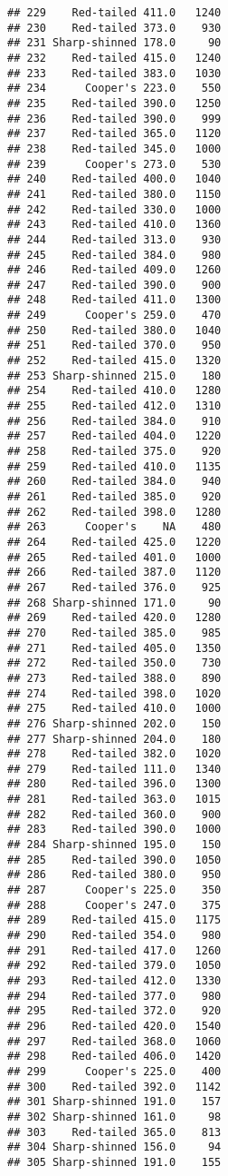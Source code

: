\documentclass[
]{article}
\begin{document}
\begin{verbatim}
## 229    Red-tailed 411.0   1240
## 230    Red-tailed 373.0    930
## 231 Sharp-shinned 178.0     90
## 232    Red-tailed 415.0   1240
## 233    Red-tailed 383.0   1030
## 234      Cooper's 223.0    550
## 235    Red-tailed 390.0   1250
## 236    Red-tailed 390.0    999
## 237    Red-tailed 365.0   1120
## 238    Red-tailed 345.0   1000
## 239      Cooper's 273.0    530
## 240    Red-tailed 400.0   1040
## 241    Red-tailed 380.0   1150
## 242    Red-tailed 330.0   1000
## 243    Red-tailed 410.0   1360
## 244    Red-tailed 313.0    930
## 245    Red-tailed 384.0    980
## 246    Red-tailed 409.0   1260
## 247    Red-tailed 390.0    900
## 248    Red-tailed 411.0   1300
## 249      Cooper's 259.0    470
## 250    Red-tailed 380.0   1040
## 251    Red-tailed 370.0    950
## 252    Red-tailed 415.0   1320
## 253 Sharp-shinned 215.0    180
## 254    Red-tailed 410.0   1280
## 255    Red-tailed 412.0   1310
## 256    Red-tailed 384.0    910
## 257    Red-tailed 404.0   1220
## 258    Red-tailed 375.0    920
## 259    Red-tailed 410.0   1135
## 260    Red-tailed 384.0    940
## 261    Red-tailed 385.0    920
## 262    Red-tailed 398.0   1280
## 263      Cooper's    NA    480
## 264    Red-tailed 425.0   1220
## 265    Red-tailed 401.0   1000
## 266    Red-tailed 387.0   1120
## 267    Red-tailed 376.0    925
## 268 Sharp-shinned 171.0     90
## 269    Red-tailed 420.0   1280
## 270    Red-tailed 385.0    985
## 271    Red-tailed 405.0   1350
## 272    Red-tailed 350.0    730
## 273    Red-tailed 388.0    890
## 274    Red-tailed 398.0   1020
## 275    Red-tailed 410.0   1000
## 276 Sharp-shinned 202.0    150
## 277 Sharp-shinned 204.0    180
## 278    Red-tailed 382.0   1020
## 279    Red-tailed 111.0   1340
## 280    Red-tailed 396.0   1300
## 281    Red-tailed 363.0   1015
## 282    Red-tailed 360.0    900
## 283    Red-tailed 390.0   1000
## 284 Sharp-shinned 195.0    150
## 285    Red-tailed 390.0   1050
## 286    Red-tailed 380.0    950
## 287      Cooper's 225.0    350
## 288      Cooper's 247.0    375
## 289    Red-tailed 415.0   1175
## 290    Red-tailed 354.0    980
## 291    Red-tailed 417.0   1260
## 292    Red-tailed 379.0   1050
## 293    Red-tailed 412.0   1330
## 294    Red-tailed 377.0    980
## 295    Red-tailed 372.0    920
## 296    Red-tailed 420.0   1540
## 297    Red-tailed 368.0   1060
## 298    Red-tailed 406.0   1420
## 299      Cooper's 225.0    400
## 300    Red-tailed 392.0   1142
## 301 Sharp-shinned 191.0    157
## 302 Sharp-shinned 161.0     98
## 303    Red-tailed 365.0    813
## 304 Sharp-shinned 156.0     94
## 305 Sharp-shinned 191.0    155

\end{verbatim}
\end{document}
